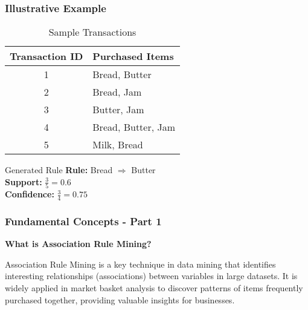 \documentclass{beamer}
\begin{document}
\begin{frame}[fragile]
    \frametitle{Illustrative Example}
    
    \begin{table}[]
        \centering
        \begin{tabular}{|c|l|}
            \hline
            \textbf{Transaction ID} & \textbf{Purchased Items} \\ \hline
            1                        & Bread, Butter            \\ \hline
            2                        & Bread, Jam               \\ \hline
            3                        & Butter, Jam              \\ \hline
            4                        & Bread, Butter, Jam       \\ \hline
            5                        & Milk, Bread              \\ \hline
        \end{tabular}
        \caption{Sample Transactions}
    \end{table}
    
    \begin{block}{Generated Rule}
        \textbf{Rule:} Bread \( \Rightarrow \) Butter \\
        \textbf{Support:} \( \frac{3}{5} = 0.6\) \\
        \textbf{Confidence:} \( \frac{3}{4} = 0.75\)
    \end{block}
\end{frame}

\begin{frame}[fragile]
    \frametitle{Fundamental Concepts - Part 1}
    \textbf{What is Association Rule Mining?}
    
    Association Rule Mining is a key technique in data mining that identifies interesting relationships (associations) between variables in large datasets. 
    It is widely applied in market basket analysis to discover patterns of items frequently purchased together, providing valuable insights for businesses.
\end{frame}
\end{document}
